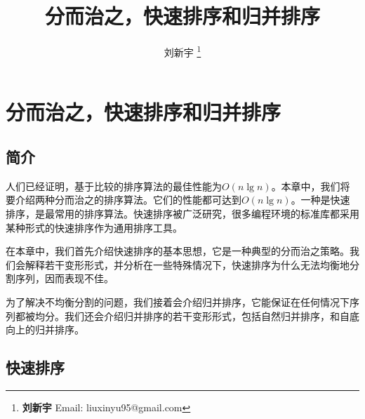 \documentclass{ctexart}
\begin{document}


\title{分而治之，快速排序和归并排序}

\author{刘新宇
\thanks{{\bfseries 刘新宇 } \newline
  Email: liuxinyu95@gmail.com \newline}
  }

\maketitle
\fi


\ifx\wholebook\relax
\chapter{分而治之，快速排序和归并排序}
\fi

\section{简介}
\label{introduction}

人们已经证明，基于比较的排序算法的最佳性能为$O(n \lg n)$\cite{TAOCP}。本章中，我们将要介绍两种分而治之的排序算法。它们的性能都可达到$O(n \lg n)$。一种是快速排序，是最常用的排序算法。快速排序被广泛研究，很多编程环境的标准库都采用某种形式的快速排序作为通用排序工具。

在本章中，我们首先介绍快速排序的基本思想，它是一种典型的分而治之策略。我们会解释若干变形形式，并分析在一些特殊情况下，快速排序为什么无法均衡地分割序列，因而表现不佳。

为了解决不均衡分割的问题，我们接着会介绍归并排序，它能保证在任何情况下序列都被均分。我们还会介绍归并排序的若干变形形式，包括自然归并排序，和自底向上的归并排序。

\section{快速排序}
\end{document}
